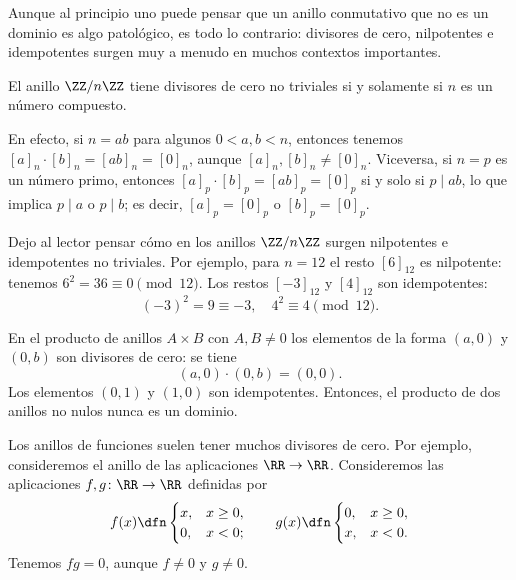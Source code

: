 Aunque al principio uno puede pensar que un anillo conmutativo que no es un
dominio es algo patológico, es todo lo contrario: divisores de cero, nilpotentes
e idempotentes surgen muy a menudo en muchos contextos importantes.

\begin{ejemplo}
  El anillo $\ZZ/n\ZZ$ tiene divisores de cero no triviales si y solamente si
  $n$ es un número compuesto.

  En efecto, si $n = ab$ para algunos $0 < a,b < n$, entonces tenemos
  $[a]_n \cdot [b]_n = [ab]_n = [0]_n$, aunque
  $[a]_n, [b]_n \ne [0]_n$. Viceversa, si $n = p$ es un número primo, entonces
  $[a]_p\cdot [b]_p = [ab]_p = [0]_p$ si y solo si $p \mid ab$, lo que implica
  $p \mid a$ o $p \mid b$; es decir, $[a]_p = [0]_p$ o $[b]_p = [0]_p$.
\end{ejemplo}

Dejo al lector pensar cómo en los anillos $\ZZ/n\ZZ$ surgen nilpotentes e
idempotentes no triviales. Por ejemplo, para $n = 12$ el resto $[6]_{12}$ es
nilpotente: tenemos $6^2 = 36 \equiv 0 \pmod{12}$. Los restos $[-3]_{12}$ y
$[4]_{12}$ son idempotentes:
$$(-3)^2 = 9 \equiv -3, \quad 4^2 \equiv 4 \pmod{12}.$$

\begin{ejemplo}
  En el producto de anillos $A\times B$ con $A,B \ne 0$ los elementos de
  la forma $(a,0)$ y $(0,b)$ son divisores de cero: se tiene
  $$(a,0)\cdot (0,b) = (0,0).$$
  Los elementos $(0,1)$ y $(1,0)$ son idempotentes. Entonces, el producto de dos
  anillos no nulos nunca es un dominio.
\end{ejemplo}

\begin{ejemplo}
  Los anillos de funciones suelen tener muchos divisores de cero. Por ejemplo,
  consideremos el anillo de las aplicaciones $\RR \to \RR$. Consideremos las
  aplicaciones $f,g\colon \RR\to \RR$ definidas por
  \[ f (x) \dfn \begin{cases}
      x, & x \ge 0,\\
      0, & x < 0;
    \end{cases}
    \quad\quad
    g (x) \dfn \begin{cases}
      0, & x \ge 0,\\
      x, & x < 0.
    \end{cases} \]
  Tenemos $fg = 0$, aunque $f\ne 0$ y $g\ne 0$.
\end{ejemplo}


